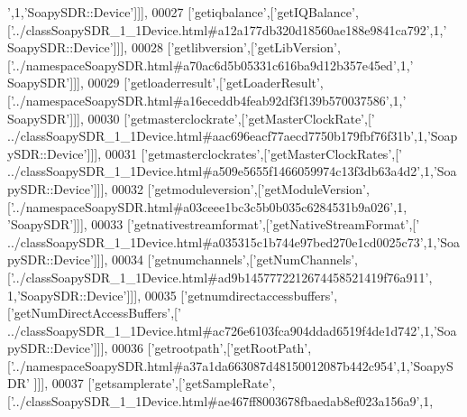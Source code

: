 \begin{DoxyCode}
{      '},1,\textcolor{stringliteral}{'SoapySDR::Device'}]]],
00027   [\textcolor{stringliteral}{'getiqbalance'},[\textcolor{stringliteral}{'getIQBalance'},[\textcolor{stringliteral}{'../classSoapySDR\_1\_1Device.html#a12a177db320d18560ae188e9841ca792'},1,\textcolor{stringliteral}{'
      SoapySDR::Device'}]]],
00028   [\textcolor{stringliteral}{'getlibversion'},[\textcolor{stringliteral}{'getLibVersion'},[\textcolor{stringliteral}{'../namespaceSoapySDR.html#a70ac6d5b05331c616ba9d12b357e45ed'},1,\textcolor{stringliteral}{'
      SoapySDR'}]]],
00029   [\textcolor{stringliteral}{'getloaderresult'},[\textcolor{stringliteral}{'getLoaderResult'},[\textcolor{stringliteral}{'../namespaceSoapySDR.html#a16eceddb4feab92df3f139b570037586'},1,\textcolor{stringliteral}{'
      SoapySDR'}]]],
00030   [\textcolor{stringliteral}{'getmasterclockrate'},[\textcolor{stringliteral}{'getMasterClockRate'},[\textcolor{stringliteral}{'
      ../classSoapySDR\_1\_1Device.html#aac696eacf77aecd7750b179fbf76f31b'},1,\textcolor{stringliteral}{'SoapySDR::Device'}]]],
00031   [\textcolor{stringliteral}{'getmasterclockrates'},[\textcolor{stringliteral}{'getMasterClockRates'},[\textcolor{stringliteral}{'
      ../classSoapySDR\_1\_1Device.html#a509e5655f1466059974c13f3db63a4d2'},1,\textcolor{stringliteral}{'SoapySDR::Device'}]]],
00032   [\textcolor{stringliteral}{'getmoduleversion'},[\textcolor{stringliteral}{'getModuleVersion'},[\textcolor{stringliteral}{'../namespaceSoapySDR.html#a03ceee1bc3c5b0b035c6284531b9a026'},1,\textcolor{stringliteral}{
      'SoapySDR'}]]],
00033   [\textcolor{stringliteral}{'getnativestreamformat'},[\textcolor{stringliteral}{'getNativeStreamFormat'},[\textcolor{stringliteral}{'
      ../classSoapySDR\_1\_1Device.html#a035315c1b744e97bed270e1cd0025c73'},1,\textcolor{stringliteral}{'SoapySDR::Device'}]]],
00034   [\textcolor{stringliteral}{'getnumchannels'},[\textcolor{stringliteral}{'getNumChannels'},[\textcolor{stringliteral}{'../classSoapySDR\_1\_1Device.html#ad9b1457772212674458521419f76a911'},
      1,\textcolor{stringliteral}{'SoapySDR::Device'}]]],
00035   [\textcolor{stringliteral}{'getnumdirectaccessbuffers'},[\textcolor{stringliteral}{'getNumDirectAccessBuffers'},[\textcolor{stringliteral}{'
      ../classSoapySDR\_1\_1Device.html#ac726e6103fca904ddad6519f4de1d742'},1,\textcolor{stringliteral}{'SoapySDR::Device'}]]],
00036   [\textcolor{stringliteral}{'getrootpath'},[\textcolor{stringliteral}{'getRootPath'},[\textcolor{stringliteral}{'../namespaceSoapySDR.html#a37a1da663087d48150012087b442c954'},1,\textcolor{stringliteral}{'SoapySDR'}
      ]]],
00037   [\textcolor{stringliteral}{'getsamplerate'},[\textcolor{stringliteral}{'getSampleRate'},[\textcolor{stringliteral}{'../classSoapySDR\_1\_1Device.html#ae467ff8003678fbaedab8ef023a156a9'},1,\textcolor{stringliteral}{
}
\end{DoxyCode}
